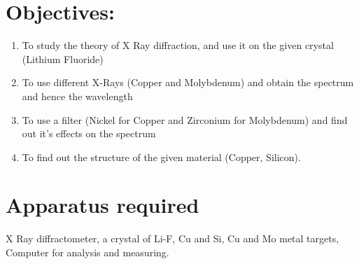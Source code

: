 \documentclass[]{report}[12 pt]
\begin{document}
	
	\section*{Objectives:}
	\begin{enumerate}
	\item To study the theory of X Ray diffraction, and use it on the given crystal (Lithium Fluoride)
	\item To use different X-Rays (Copper and Molybdenum) and obtain the spectrum and hence the wavelength
	\item To use a filter (Nickel for Copper and Zirconium for Molybdenum) and find out it's effects on the spectrum
	\item To find out the structure of the given material (Copper, Silicon).
	\end{enumerate}
	\section*{Apparatus required}
	X Ray diffractometer, a crystal of Li-F, Cu and Si, Cu and Mo metal targets, Computer for analysis and measuring.
\end{document}
